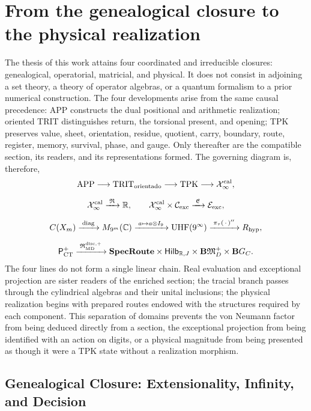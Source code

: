 \section*{From the genealogical closure to the physical realization}

The thesis of this work attains four coordinated and irreducible closures:
genealogical, operatorial, matricial, and physical. It does not consist in adjoining a
set theory, a theory of operator algebras, or a quantum formalism
to a prior numerical construction. The four developments arise from
the same causal precedence: APP constructs the dual positional and
arithmetic realization; oriented TRIT distinguishes return, the torsional present, and opening;
TPK preserves value, sheet, orientation, residue, quotient, carry, boundary,
route, register, memory, survival, phase, and gauge. Only thereafter are
the compatible section, its readers, and its representations formed. The governing diagram
is, therefore,
\[
\begin{gathered}
 \mathrm{APP}
 \longrightarrow \mathrm{TRIT}_{\rm orientado}
 \longrightarrow \mathrm{TPK}
 \longrightarrow \mathcal X_\infty^{\rm cal},\\[2mm]
 \mathcal X_\infty^{\rm cal}
 \xrightarrow{\;\mathfrak R\;}\mathbb R,
 \qquad
 \mathcal X_\infty^{\rm cal}\times\mathcal C_{\rm exc}
 \xrightarrow{\;\mathfrak E\;}\mathcal E_{\rm exc},\\[2mm]
 C(X_m)\xrightarrow{\;\operatorname{diag}\;}M_{9^m}(\mathbb C)
 \xrightarrow{\;a\mapsto a\otimes I_9\;}
 \mathrm{UHF}(9^\infty)
 \xrightarrow{\;\pi_\tau(\,\cdot\,)''\;}R_{\rm hyp},\\[2mm]
 \mathsf P_{\rm CT}^{+}
 \xrightarrow{\;\mathfrak R_{\rm MD}^{\rm disc,+}\;}
 \mathbf{SpecRoute}\times\mathsf{Hilb}_{\mathbb R,J}
 \times\mathbf B\mathfrak M_D^+\times\mathbf B G_C.
\end{gathered}
\]
The four lines do not form a single linear chain. Real evaluation and exceptional projection are sister readers of the enriched section; the tracial branch passes through the cylindrical algebras and their unital inclusions; the physical realization begins with prepared routes endowed with the structures required by each component. This separation of domains prevents the von Neumann factor from being deduced directly from a section, the exceptional projection from being identified with an action on digits, or a physical magnitude from being presented as though it were a TPK state without a realization morphism.

\subsection*{Genealogical Closure: Extensionality, Infinity, and Decision}

